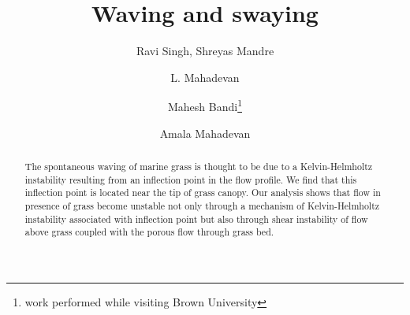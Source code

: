 \documentclass[aps,twocolumn,floatfix,prl,10pt]{revtex4-1}
\begin{document}
\title{Waving and swaying}
\author{Ravi Singh, Shreyas Mandre}
\author{L. Mahadevan}
\author{Mahesh Bandi\footnote{work performed while visiting Brown University}}
\author{Amala Mahadevan}

\begin{abstract}


The spontaneous waving of marine grass is thought to be due to a Kelvin-Helmholtz instability resulting from an inflection point in the flow profile. We find that this inflection point
is located near the tip of grass canopy. Our analysis shows that flow in presence of grass become unstable not only through a mechanism of Kelvin-Helmholtz instability associated with 
inflection point but also through shear instability of flow above grass coupled with the porous flow through grass bed.
\end{abstract}
\maketitle
\end{document}
